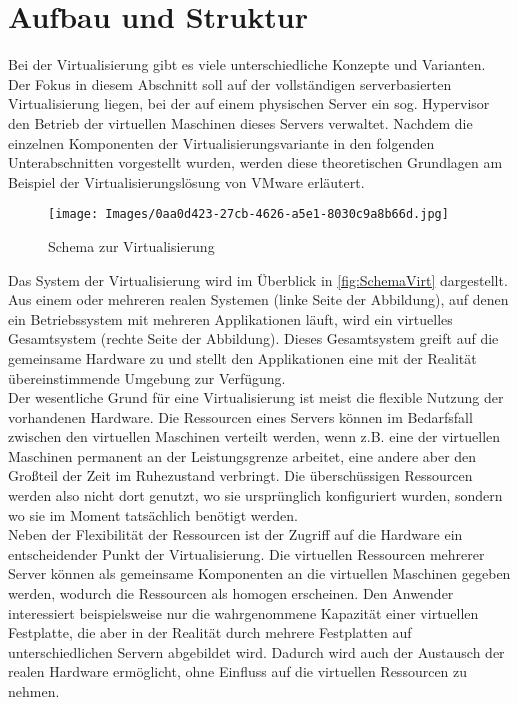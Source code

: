 \section{Aufbau und Struktur}
Bei der Virtualisierung gibt es viele unterschiedliche Konzepte und Varianten. Der Fokus in diesem Abschnitt soll auf der vollständigen serverbasierten Virtualisierung liegen, bei der auf einem physischen Server ein sog. Hypervisor den Betrieb der virtuellen Maschinen dieses Servers verwaltet. Nachdem die einzelnen Komponenten der Virtualisierungsvariante in den folgenden Unterabschnitten vorgestellt wurden, werden diese theoretischen Grundlagen am Beispiel der Virtualisierungslösung von VMware erläutert.
\begin{figure}[H]
    \centering
    \texttt{[image: Images/0aa0d423-27cb-4626-a5e1-8030c9a8b66d.jpg]}\caption[Schema zur Virtualisierung]{Schema zur Virtualisierung~\cite[S.~9]{SiemensIndustryOnlineSupport2018}}
    \label{fig:SchemaVirt}
\end{figure}
Das System der Virtualisierung wird im Überblick in \autoref{fig:SchemaVirt} dargestellt. Aus einem oder mehreren realen Systemen (linke Seite der Abbildung), auf denen ein Betriebssystem mit mehreren Applikationen läuft, wird ein virtuelles Gesamtsystem (rechte Seite der Abbildung). Dieses Gesamtsystem greift auf die gemeinsame Hardware zu und stellt den Applikationen eine mit der Realität übereinstimmende Umgebung zur Verfügung.\medskip\\
Der wesentliche Grund für eine Virtualisierung ist meist die flexible Nutzung der vorhandenen Hardware. Die Ressourcen eines Servers können im Bedarfsfall zwischen den virtuellen Maschinen verteilt werden, wenn z.B. eine der virtuellen Maschinen permanent an der Leistungsgrenze arbeitet, eine andere aber den Großteil der Zeit im Ruhezustand verbringt. Die überschüssigen Ressourcen werden also nicht dort genutzt, wo sie ursprünglich konfiguriert wurden, sondern wo sie im Moment tatsächlich benötigt werden.
\cite[S.~38 ff.]{Wohrmann2018}\medskip\\
Neben der Flexibilität der Ressourcen ist der Zugriff auf die Hardware ein entscheidender Punkt der Virtualisierung. Die virtuellen Ressourcen mehrerer Server können als gemeinsame Komponenten an die virtuellen Maschinen gegeben werden, wodurch die Ressourcen als homogen erscheinen. Den Anwender interessiert beispielsweise nur die wahrgenommene Kapazität einer virtuellen Festplatte, die aber in der Realität durch mehrere Festplatten auf unterschiedlichen Servern abgebildet wird. Dadurch wird auch der Austausch der realen Hardware ermöglicht, ohne Einfluss auf die virtuellen Ressourcen zu nehmen. \cite[S.~106 f.]{Betzler2007}
